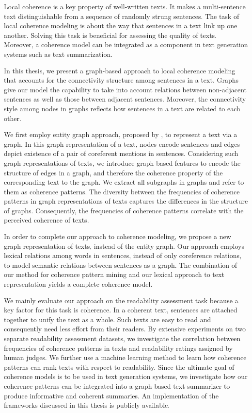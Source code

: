 \addchap*{\abstractname}

Local coherence is a key property of well-written texts. It makes a multi-sentence text distinguishable from a sequence of randomly strung sentences. 
The task of local coherence modeling is about the way that sentences in a text link up one another.  
Solving this task is beneficial for assessing the quality of texts. 
Moreover, a coherence model can be integrated as a component in text generation systems such as text summarization. 

In this thesis, we present a graph-based approach to local coherence modeling that accounts for the connectivity structure among sentences in a text. 
Graphs give our model the capability to take into account relations between non-adjacent sentences as well as those between adjacent sentences. 
Moreover, the connectivity style among nodes in graphs reflects how sentences in a text are related to each other. 

We first employ entity graph approach, proposed by , to represent a text via a graph. 
In this graph representation of a text, nodes encode sentences and edges depict existence of a pair of coreferent mentions in sentences.    
Considering such graph representations of texts, we introduce graph-based features to encode the structure of edges in a graph, and therefore the coherence property of the corresponding text to the graph.   
We extract all subgraphs in graphs and refer to them as coherence patterns. 
The diversity between the frequencies of coherence patterns in graph representations of texts captures the differences in the structure of graphs.  
Consequently, the frequencies of coherence patterns correlate with the perceived coherence of texts.  

In order to complete our approach to coherence modeling, we propose a new graph representation of texts, instead of the entity graph.  
Our approach employs lexical relations among words in sentences, instead of only coreference relations, to model semantic relations between sentences as a graph. 
The combination of our method for coherence pattern mining and our lexical approach to text representation yields a complete coherence model. 

We mainly evaluate our approach on the readability assessment task because a key factor for this task is coherence. 
In a coherent text, sentences are attached together to unify the text as a whole. 
Such texts are easy to read and consequently need less effort from their readers. 
By extensive experiments on two separate readability assessment datasets, 
we investigate the correlation between frequencies of coherence patterns in texts and readability ratings assigned by human judges.    
We further use a machine learning method to learn how coherence patterns can rank texts with respect to readability. 
Since the ultimate goal of coherence models is to be used in text generation systems, we investigate how our coherence patterns can be integrated into a graph-based text summarizer to produce informative and coherent summaries. 
An implementation of the frameworks discussed in this thesis is publicly available.


